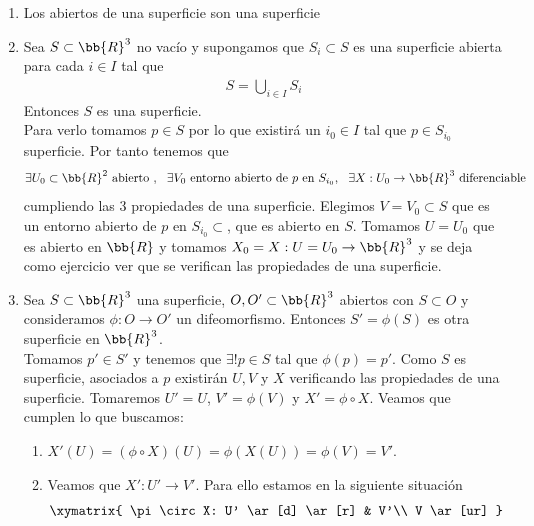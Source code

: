 \begin{ejemplo}
\begin{enumerate}
        \item Los abiertos de una superficie son una superficie
        
        \item Sea $S\subset \bb{R}^3$ no vacío y supongamos que $S_i\subset S$ es una superficie abierta para cada $i\in I$ tal que
        \begin{gather*}
            S=\bigcup\limits_{i\in I}S_i
        \end{gather*} 
        Entonces $S$ es una superficie.\\

        Para verlo tomamos $p\in S$ por lo que existirá un $i_0\in I$ tal que $p\in S_{i_0}$ superficie. Por tanto tenemos que 
        \begin{gather*}
            \exists U_0\subset \bb{R}^2 \text{ abierto },\ \ \exists V_0 \text{ entorno abierto de $p$ en $S_{i_0}$},\ \ \exists X:U_0\to \bb{R}^3\text{ diferenciable}
        \end{gather*}
        cumpliendo las 3 propiedades de una superficie. Elegimos $V=V_0\subset S$ que es un entorno abierto de $p$ en $S_{i_0}\subset$, que es abierto en $S$. Tomamos $U=U_0$ que es abierto en $\bb{R}$ y tomamos $X_0=X:U=U_0 \to \bb{R}^3$ y se deja como ejercicio ver que se verifican las propiedades de una superficie.

        \item Sea $S\subset \bb{R}^3$ una superficie, $O,O'\subset \bb{R}^3$ abiertos con $S\subset O$ y consideramos $\phi:O\to O'$ un difeomorfismo. Entonces $S'=\phi(S)$ es otra superficie en $\bb{R}^3$.\\
        
        Tomamos $p'\in S'$ y tenemos que $\exists!p\in S$ tal que $\phi(p)=p'$. Como $S$ es superficie, asociados a $p$ existirán $U,V$ y $X$ verificando las propiedades de una superficie. Tomaremos $U'=U$, $V'=\phi(V)$ y $X'=\phi \circ X$. Veamos que cumplen lo que buscamos:
        \begin{enumerate}
            \item $X'(U)=(\phi \circ X)(U)=\phi(X(U)) = \phi(V)=V'$.
            \item Veamos que $X':U'\to V'$. Para ello estamos en la siguiente situación
            \begin{gather*}
                \xymatrix{
                    \pi \circ X: U' \ar[d]  \ar[r] & V'\\
                    V \ar[ur]
                }
            \end{gather*}


\end{enumerate}
\end{enumerate}
\end{ejemplo}
